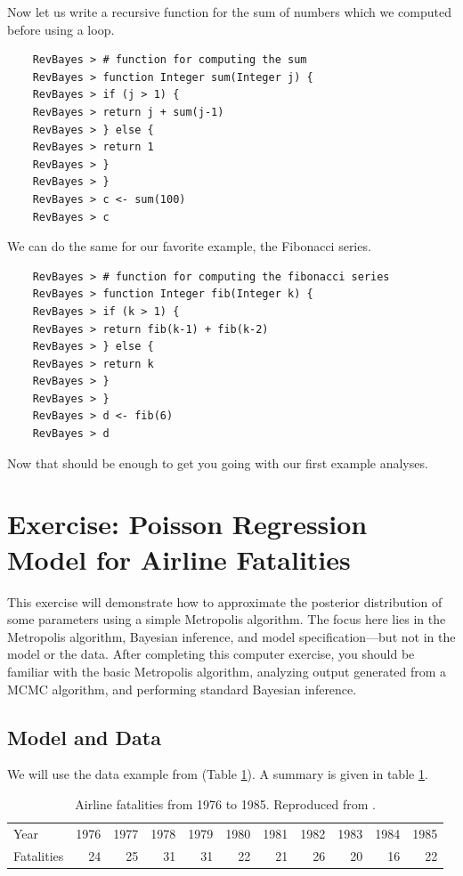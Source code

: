 Now let us write a recursive function for the sum of numbers which we computed before using a  loop.
{\tt \begin{snugshade*}
\begin{lstlisting}    
    RevBayes > # function for computing the sum
    RevBayes > function Integer sum(Integer j) {
    RevBayes > if (j > 1) {
    RevBayes > return j + sum(j-1)
    RevBayes > } else {
    RevBayes > return 1
    RevBayes > }
    RevBayes > }
    RevBayes > c <- sum(100)
    RevBayes > c
\end{lstlisting}
\end{snugshade*}}
We can do the same for our favorite example, the Fibonacci series.
{\tt \begin{snugshade*}
\begin{lstlisting}    
    RevBayes > # function for computing the fibonacci series
    RevBayes > function Integer fib(Integer k) {
    RevBayes > if (k > 1) {
    RevBayes > return fib(k-1) + fib(k-2)
    RevBayes > } else {
    RevBayes > return k
    RevBayes > }
    RevBayes > }
    RevBayes > d <- fib(6)
    RevBayes > d
\end{lstlisting}
\end{snugshade*}}
Now that should be enough to get you going with our first example analyses.

\newpage
\FloatBarrier
\section{Exercise: Poisson Regression Model for Airline Fatalities}

This exercise will demonstrate how to approximate the posterior distribution of some parameters using a simple Metropolis algorithm. 
The focus here lies in the Metropolis algorithm, Bayesian inference, and model specification---but not in the model or the data. 
After completing this computer exercise, you should be familiar with the basic Metropolis algorithm, analyzing output generated from a MCMC algorithm, and performing standard Bayesian inference.

\subsection*{Model and Data}
We will use the data example from \cite{gelman95} (Table \ref{tab:airlineFatalities}). 
A summary is given in table \ref{tab:airlineFatalities}.
\begin{table}[!hbtp]
\caption{Airline fatalities from 1976 to 1985. Reproduced from \cite[][Table 2.2 on p. 69]{gelman95}.}
\label{tab:airlineFatalities}
\smallskip
\centering
\begin{tabular}{ l | r r r r r r r r r r }
  \hline                       
  Year & 1976 & 1977 & 1978 & 1979 & 1980 & 1981 & 1982 & 1983 & 1984 & 1985 \\
  Fatalities & 24 & 25 & 31 & 31 & 22 & 21 & 26 & 20 & 16 & 22\\
  \hline  
\end{tabular}
\end{table}

